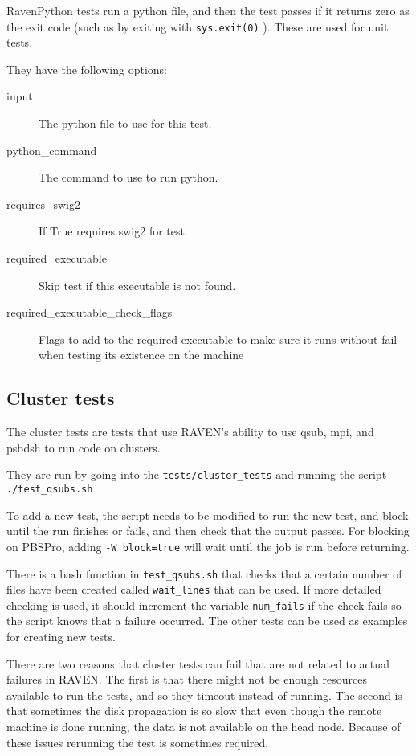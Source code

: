 \documentclass{article}
\begin{document}
RavenPython tests run a python file, and then the test passes if it
returns zero as the exit code (such as by exiting with
\verb'sys.exit(0)' ).  These are used for unit tests.

They have the following options:

\begin{description}
\item[input] The python file to use for this test.
\item[python\_command] The command to use to run python.
\item[requires\_swig2] If True requires swig2 for test.
\item[required\_executable] Skip test if this executable is not found.
\item[required\_executable\_check\_flags] Flags to add to the required executable to make sure it runs without fail when testing its existence on the machine
\end{description}

\subsection{Cluster tests}


The cluster tests are tests that use RAVEN's ability to use qsub, mpi,
and psbdsh to run code on clusters.

They are run by going into the \verb'tests/cluster_tests' and running
the script \verb'./test_qsubs.sh'

To add a new test, the script needs to be modified to run the new
test, and block until the run finishes or fails, and then check that
the output passes.  For blocking on PBSPro, adding
\verb'-W block=true' will wait until the job is run before returning.

There is a bash function in \verb'test_qsubs.sh' that checks that a
certain number of files have been created called \verb'wait_lines'
that can be used.  If more detailed checking is used, it should
increment the variable \verb'num_fails' if the check fails so the
script knows that a failure occurred.  The other tests can be used as
examples for creating new tests.

There are two reasons that cluster tests can fail that are not related
to actual failures in RAVEN.  The first is that there might not be
enough resources available to run the tests, and so they timeout
instead of running.  The second is that sometimes the disk propagation
is so slow that even though the remote machine is done running, the
data is not available on the head node.  Because of these issues
rerunning the test is sometimes required.
\end{document}
